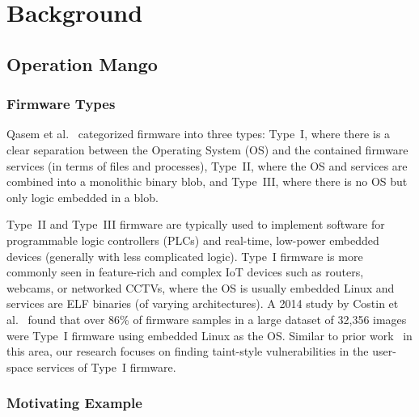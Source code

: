 \chapter{Background}
\label{ch:background}



\section{Operation Mango}
\label{sec:bg-mango}

\subsection{Firmware Types}
\label{sec:bg-firmware-types}

Qasem et al.~\cite{qasem2021automatic} categorized firmware into three types:
Type~I, where there is a clear separation between the Operating System (OS) and the contained firmware services (in terms of files and processes), Type~II, where the OS and services are combined into a monolithic binary blob, and Type~III, where there is no OS but only logic embedded in a blob.

Type~II and Type~III firmware are typically used to implement software for programmable logic controllers (PLCs) and real-time, low-power embedded devices (generally with less complicated logic).
Type~I firmware is more commonly seen in feature-rich and complex IoT devices such as routers, webcams, or networked CCTVs, where the OS is usually embedded Linux and services are ELF binaries (of varying architectures).
A 2014 study by Costin et al.~\cite{costin2014large} found that over 86\% of firmware samples in a large dataset of 32,356 images were Type~I firmware using embedded Linux as the OS.
Similar to prior work~\cite{celik2018sensitive,mandal2020cross} in this area, our research focuses on finding taint-style vulnerabilities in the user-space services of Type~I firmware.


\subsection{Motivating Example}
\label{sec:motivating_example}

